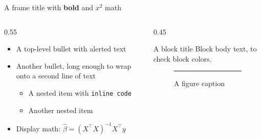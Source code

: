 \begin{frame}{A frame title with \textbf{bold} and $x^2$ math}

  \begin{columns}
    \begin{column}{0.55\linewidth}
      \begin{itemize}
        \item A top-level bullet with \alert{alerted} text
        \item Another bullet, long enough to wrap onto a second line of text
          \begin{itemize}
            \item A nested item with \texttt{inline code}
            \item Another nested item
          \end{itemize}
        \item Display math: $\displaystyle \hat\beta = (X^\top X)^{-1} X^\top y$
      \end{itemize}
    \end{column}
    \begin{column}{0.45\linewidth}
      \begin{block}{A block title}
        Block body text, to check block colors.
      \end{block}
      \begin{figure}
        \centering
        \rule{0.6\linewidth}{2.5cm}
        \caption{A figure caption}
      \end{figure}
    \end{column}
  \end{columns}

\end{frame}
